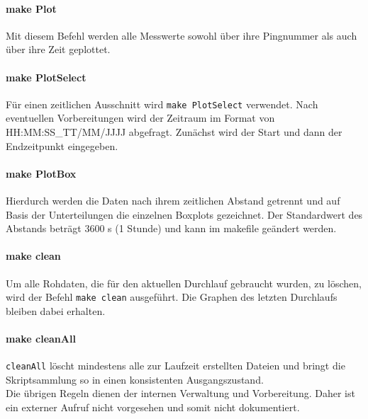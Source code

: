 \documentclass[a4 paper, 12 pt]{paper}
\begin{document}
	\paragraph{make Plot}
		Mit diesem Befehl werden alle Messwerte sowohl über ihre Pingnummer als auch über ihre Zeit geplottet.
	\paragraph{make PlotSelect}
		Für einen zeitlichen Ausschnitt wird \verb|make PlotSelect| verwendet. Nach eventuellen Vorbereitungen wird der Zeitraum im Format von HH:MM:SS\_TT/MM/JJJJ abgefragt. Zunächst wird der Start und dann der Endzeitpunkt eingegeben.
	\paragraph{make PlotBox}
		Hierdurch werden die Daten nach ihrem zeitlichen Abstand getrennt und auf Basis der Unterteilungen die einzelnen Boxplots gezeichnet. Der Standardwert des Abstands beträgt 3600 s (1 Stunde) und kann im makefile geändert werden.
	\paragraph{make clean}
		Um alle Rohdaten, die für den aktuellen Durchlauf gebraucht wurden, zu löschen, wird der Befehl \verb|make clean| ausgeführt. Die Graphen des letzten Durchlaufs bleiben dabei erhalten.
	\paragraph{make cleanAll}
		\verb|cleanAll| löscht mindestens alle zur Laufzeit erstellten Dateien und bringt die Skriptsammlung so in einen konsistenten Ausgangszustand.\\
	
	Die übrigen Regeln dienen der internen Verwaltung und Vorbereitung. Daher ist ein externer Aufruf nicht vorgesehen und somit nicht dokumentiert.
\end{document}
